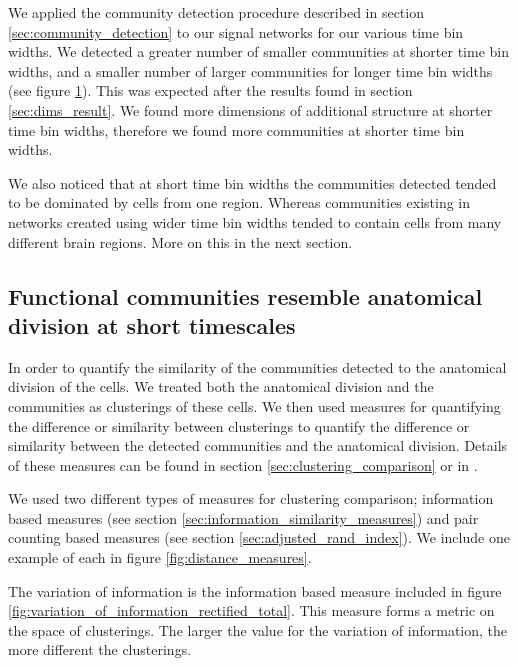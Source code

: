 \begin{figure}[p]
    \label{fig:consensus_clusterings_with_regions}
  \end{figure}

  We applied the community detection procedure described in section \ref{sec:community_detection} to our signal networks for our various time bin widths. We detected a greater number of smaller communities at shorter time bin widths, and a smaller number of larger communities for longer time bin widths (see figure \ref{fig:consensus_clusterings_with_regions}). This was expected after the results found in section \ref{sec:dims_result}. We found more dimensions of additional structure at shorter time bin widths, therefore we found more communities at shorter time bin widths.

  We also noticed that at short time bin widths the communities detected tended to be dominated by cells from one region. Whereas communities existing in networks created using wider time bin widths tended to contain cells from many different brain regions. More on this in the next section.


  \subsection{Functional communities resemble anatomical division at short timescales}
  In order to quantify the similarity of the communities detected to the anatomical division of the cells. We treated both the anatomical division and the communities as clusterings of these cells. We then used measures for quantifying the difference or similarity between clusterings to quantify the difference or similarity between the detected communities and the anatomical division. Details of these measures can be found in section \ref{sec:clustering_comparison} or in  \parencite{vinh}.

  We used two different types of measures for clustering comparison; information based measures (see section \ref{sec:information_similarity_measures}) and pair counting based measures (see section \ref{sec:adjusted_rand_index}). We include one example of each in figure \ref{fig:distance_measures}.

  The variation of information is the information based measure included in figure \ref{fig:variation_of_information_rectified_total}. This measure forms a metric on the space of clusterings. The larger the value for the variation of information, the more different the clusterings.

